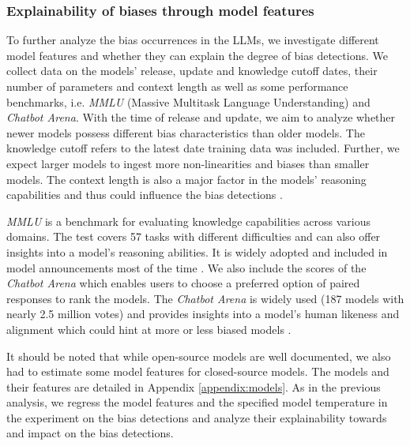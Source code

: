 \subsubsection{Explainability of biases through model features}
\par To further analyze the bias occurrences in the LLMs, we investigate different model features and whether they can explain the degree of bias detections. We collect data on the models' release, update and knowledge cutoff dates, their number of parameters and context length as well as some performance benchmarks, i.e. \textit{MMLU} (Massive Multitask Language Understanding) and \textit{Chatbot Arena}. With the time of release and update, we aim to analyze whether newer models possess different bias characteristics than older models. The knowledge cutoff refers to the latest date training data was included. Further, we expect larger models to ingest more non-linearities and biases than smaller models. The context length is also a major factor in the models' reasoning capabilities and thus could influence the bias detections \parencite{naveed2023comprehensive, zhao2023survey}.

\par \textit{MMLU} is a benchmark for evaluating knowledge capabilities across various domains. The test covers 57 tasks with different difficulties and can also offer insights into a model's reasoning abilities. It is widely adopted and included in model announcements most of the time \parencite{hendrycks2020measuring}. We also include the scores of the \textit{Chatbot Arena} which enables users to choose a preferred option of paired responses to rank the models. The \textit{Chatbot Arena} is widely used (187 models with nearly 2.5 million votes) and provides insights into a model's human likeness and alignment which could hint at more or less biased models \parencite{chiang2024chatbot, huggingface2024chatbotarena}.

\par It should be noted that while open-source models are well documented, we also had to estimate some model features for closed-source models. The models and their features are detailed in Appendix \ref{appendix:models}. As in the previous analysis, we regress the model features and the specified model temperature in the experiment on the bias detections and analyze their explainability towards and impact on the bias detections.